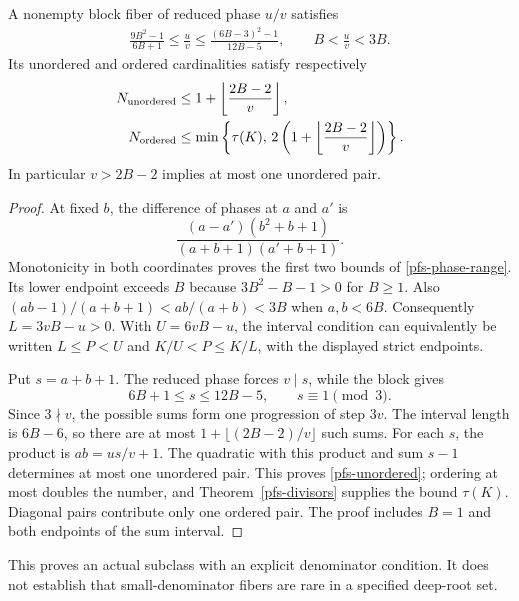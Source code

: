 \begin{theorem}\label{pfs-denominator}
A nonempty block fiber of reduced phase $u/v$ satisfies
\begin{gather}
 \frac{9B^2-1}{6B+1}\leq\frac uv
 \leq\frac{(6B-3)^2-1}{12B-5},\qquad
 B<\frac uv<3B.\label{pfs-phase-range}
\end{gather}
Its unordered and ordered cardinalities satisfy respectively
\begin{align}
 N_{\rm unordered}&\leq1+\left\lfloor\frac{2B-2}{v}\right\rfloor,
 \label{pfs-unordered}\\
 N_{\rm ordered}&\leq
 \min\left\{\tau(K),\,2\left(1+\left\lfloor\frac{2B-2}{v}\right\rfloor\right)\right\}.
 \label{pfs-ordered}
\end{align}
In particular $v>2B-2$ implies at most one unordered pair.
\end{theorem}
\begin{proof}
At fixed $b$, the difference of phases at $a$ and $a'$ is
\[
 \frac{(a-a')(b^2+b+1)}{(a+b+1)(a'+b+1)}.
\]
Monotonicity in both coordinates proves the first two bounds of
\eqref{pfs-phase-range}. Its lower endpoint exceeds $B$ because
$3B^2-B-1>0$ for $B\geq1$. Also
$(ab-1)/(a+b+1)<ab/(a+b)<3B$ when $a,b<6B$.
Consequently $L=3vB-u>0$. With $U=6vB-u$, the interval condition
can equivalently be written
$L\leq P<U$ and $K/U<P\leq K/L$, with the displayed strict endpoints.

Put $s=a+b+1$. The reduced phase forces $v\mid s$, while the
block gives
\[
 6B+1\leq s\leq12B-5,\qquad s\equiv1\pmod3.
\]
Since $3\nmid v$, the possible sums form one progression of step
$3v$. The interval length is $6B-6$, so there are at most
$1+\lfloor(2B-2)/v\rfloor$ such sums. For each $s$, the product is
$ab=us/v+1$. The quadratic with this product and sum $s-1$
determines at most one unordered pair. This proves
\eqref{pfs-unordered}; ordering at most doubles the number, and
Theorem~\ref{pfs-divisors} supplies the bound $\tau(K)$.
Diagonal pairs contribute only one ordered pair. The proof includes
$B=1$ and both endpoints of the sum interval.
\end{proof}

This proves an actual subclass with an explicit denominator
condition. It does not establish that small-denominator fibers
are rare in a specified deep-root set.


